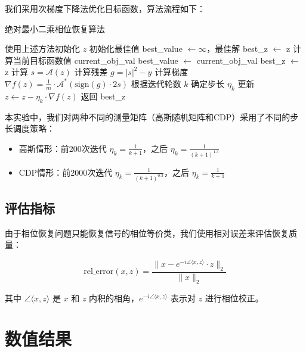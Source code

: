 \documentclass{article}
\begin{document}
我们采用次梯度下降法优化目标函数，算法流程如下：

\begin{algorithm}
    \caption{绝对最小二乘相位恢复算法}
    \begin{algorithmic}[1]
        \State 使用上述方法初始化 $z$
        \State 初始化最佳值 best\_value $\gets \infty$，最佳解 best\_z $\gets$ z
        \State 计算当前目标函数值 current\_obj\_val
        \State best\_value $\gets$ current\_obj\_val
        \State best\_z $\gets$ z
        \EndIf
        \State 计算 $s = \mathcal{A}(z)$
        \State 计算残差 $g = |s|^2 - y$
        \State 计算梯度 $\nabla f(z) = \frac{1}{m} \cdot
        \mathcal{A}^*(\text{sign}(g) \cdot 2s)$
        \State 根据迭代轮数 $k$ 确定步长 $\eta_k$
        \State 更新 $z \gets z - \eta_k \cdot \nabla f(z)$
        \EndFor
        \State 返回 best\_z
    \end{algorithmic}
\end{algorithm}

本实验中，我们对两种不同的测量矩阵（高斯随机矩阵和CDP）采用了不同的步长调度策略：

\begin{itemize}
    \item 高斯情形：前200次迭代 $\eta_k = \frac{1}{k+1}$，之后 $\eta_k =
        \frac{1}{(k+1)^{1.3}}$
    \item CDP情形：前2000次迭代 $\eta_k = \frac{1}{(k+1)^{0.3}}$，之后 $\eta_k
        = \frac{1}{k+1}$
\end{itemize}

\subsection{评估指标}

由于相位恢复问题只能恢复信号的相位等价类，我们使用相对误差来评估恢复质量：

\begin{equation}
    \text{rel\_error}(x, z) = \frac{\|x - e^{-i\angle\langle x,
    z\rangle} \cdot z\|_2}{\|x\|_2}
\end{equation}

其中 $\angle\langle x, z\rangle$ 是 $x$ 和 $z$ 内积的相角，$e^{-i\angle\langle
x, z\rangle}$ 表示对 $z$ 进行相位校正。

\section{数值结果}
\end{document}
